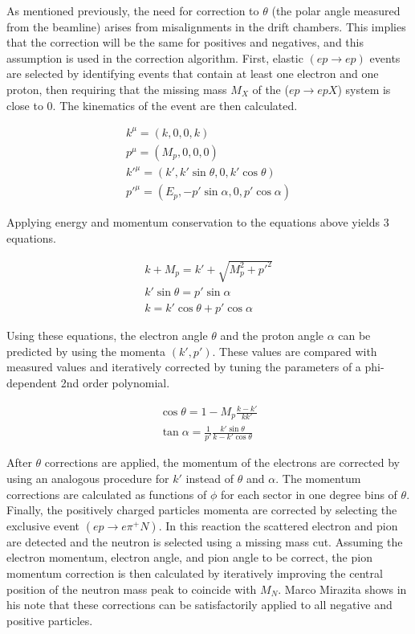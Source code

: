 As mentioned previously, the need for correction to $\theta$ (the polar angle measured from the beamline) arises from misalignments in the drift chambers.  This implies that the correction will be the same for positives and negatives, and this assumption is used in the correction algorithm.  First, elastic $(ep \rightarrow ep)$ events are selected by identifying events that contain at least one electron and one proton, then requiring that the missing mass $M_X$ of the ($ep \rightarrow epX$) system is close to 0.  The kinematics of the event are then calculated.

\begin{gather}
	k^{\mu} = (k, 0, 0, k)                         \\
	p^{\mu} = (M_{p}, 0, 0, 0)                     \\
	k'^{\mu} = (k', k'\sin\theta, 0, k'\cos\theta) \\
	p'^{\mu} = (E_{p}, -p'\sin\alpha, 0, p'\cos\alpha) 
\end{gather}

Applying energy and momentum conservation to the equations above yields 3 equations.

\begin{gather}
	k + M_p = k' + \sqrt{M_{p}^{2} + p'^2} \\
	k'\sin\theta = p'\sin\alpha            \\
	k = k'\cos\theta + p'\cos\alpha  
\end{gather}

Using these equations, the electron angle $\theta$ and the proton angle $\alpha$ can be predicted by using the momenta $(k',p')$.  These values are compared with measured values and iteratively corrected by tuning the parameters of a phi-dependent 2nd order polynomial.

\begin{gather}
	\cos\theta = 1 - M_p \frac{k-k'}{kk'} \\
	\tan\alpha = \frac{1}{p'} \frac{k'\sin\theta}{k-k'\cos\theta}
\end{gather}

After $\theta$ corrections are applied, the momentum of the electrons are corrected by using an analogous procedure for $k'$ instead of $\theta$ and $\alpha$.  The momentum corrections are calculated as functions of $\phi$ for each sector in one degree bins of $\theta$.  Finally, the positively charged particles momenta are corrected by selecting the exclusive event $(ep \rightarrow e\pi^+N)$.  In this reaction the scattered electron and pion are detected and the neutron is selected using a missing mass cut.  Assuming the electron momentum, electron angle, and pion angle to be correct, the pion momentum correction is then calculated by iteratively improving the central position of the neutron mass peak to coincide with $M_{N}$.  Marco Mirazita shows in his note that these corrections can be satisfactorily applied to all negative and positive particles.

